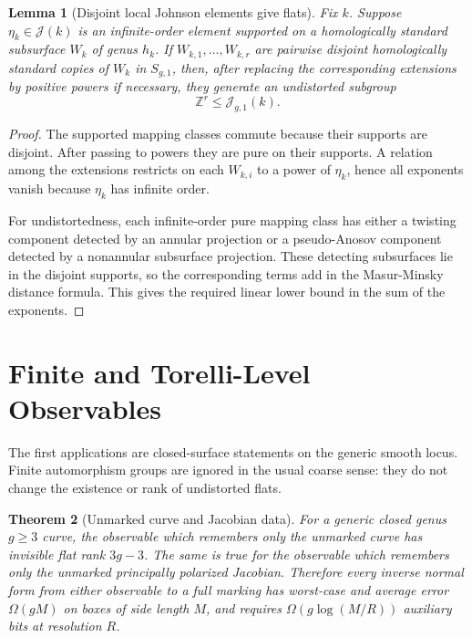 \documentclass[11pt]{article}
\newtheorem{theorem}{Theorem}[section]
\newtheorem{lemma}[theorem]{Lemma}
\begin{document}
\begin{lemma}[Disjoint local Johnson elements give flats]
Fix \(k\).  Suppose \(\eta_k\in\mathcal J(k)\) is an infinite-order element
supported on a homologically standard subsurface \(W_k\) of genus \(h_k\).  If
\(W_{k,1},\ldots,W_{k,r}\) are pairwise disjoint homologically standard copies
of \(W_k\) in \(S_{g,1}\), then, after replacing the corresponding extensions by
positive powers if necessary, they generate an undistorted subgroup
\[
\mathbb Z^r\le \mathcal J_{g,1}(k).
\]
\end{lemma}

\begin{proof}
The supported mapping classes commute because their supports are disjoint.
After passing to powers they are pure on their supports.  A relation among the
extensions restricts on each \(W_{k,i}\) to a power of \(\eta_k\), hence all
exponents vanish because \(\eta_k\) has infinite order.

For undistortedness, each infinite-order pure mapping class has either a
twisting component detected by an annular projection or a pseudo-Anosov
component detected by a nonannular subsurface projection.  These detecting
subsurfaces lie in the disjoint supports, so the corresponding terms add in the
Masur-Minsky distance formula.  This gives the required linear lower bound in
the sum of the exponents.
\end{proof}

\section{Finite and Torelli-Level Observables}

The first applications are closed-surface statements on the generic smooth
locus.  Finite automorphism groups are ignored in the usual coarse sense: they
do not change the existence or rank of undistorted flats.

\begin{theorem}[Unmarked curve and Jacobian data]
For a generic closed genus \(g\ge3\) curve, the observable which remembers only
the unmarked curve has invisible flat rank \(3g-3\).  The same is true for the
observable which remembers only the unmarked principally polarized Jacobian.
Therefore every inverse normal form from either observable to a full marking has
worst-case and average error \(\Omega(gM)\) on boxes of side length \(M\), and
requires \(\Omega(g\log(M/R))\) auxiliary bits at resolution \(R\).
\end{theorem}
\end{document}
